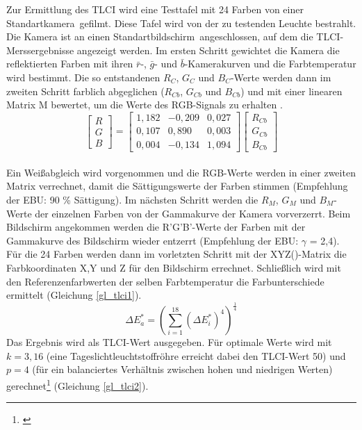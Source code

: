 Zur Ermittlung des TLCI wird eine Testtafel mit 24 Farben von einer \glqq Standartkamera\grqq\ gefilmt. Diese Tafel wird von der zu testenden Leuchte bestrahlt. Die Kamera ist an einen \glqq Standartbildschirm\grqq\ angeschlossen, auf dem die TLCI-Merssergebnisse angezeigt werden.
Im ersten Schritt gewichtet die Kamera die reflektierten Farben mit ihren $\bar{r}$-, $\bar{g}$- und $\bar{b}$-Kamerakurven und die Farbtemperatur wird bestimmt. Die so entstandenen $R_{C}$, $G_{C}$ und $B_{C}$-Werte werden dann im zweiten Schritt farblich abgeglichen ($R_{Cb}$, $G_{Cb}$ und $B_{Cb}$) und mit einer linearen Matrix M bewertet, um die Werte des RGB-Signals zu erhalten .
\begin{equation}\label{gl_tlci1}
\begin{bmatrix} R \\ G \\ B \end{bmatrix}= 
\begin{bmatrix} 1,182 & -0,209 & 0,027 \\ 0,107 & 0,890 & 0,003 \\ 0,004 & -0,134 & 1,094 \end{bmatrix}
\begin{bmatrix} R_{Cb} \\ G_{Cb} \\ B_{Cb} \end{bmatrix}
\end{equation}\\
Ein Weißabgleich wird vorgenommen und die RGB-Werte werden in einer zweiten Matrix verrechnet, damit die Sättigungswerte der Farben stimmen (Empfehlung der EBU: 90 \% Sättigung). Im nächsten Schritt werden die $R_{M}$, $G_{M}$ und $B_{M}$-Werte der einzelnen Farben von der Gammakurve der Kamera vorverzerrt.
Beim Bildschirm angekommen werden die R'G'B'-Werte der Farben mit der Gammakurve des Bildschirm wieder entzerrt (Empfehlung der EBU: $\gamma$ = 2,4). Für die 24 Farben werden dann im vorletzten Schritt mit der XYZ()-Matrix  die Farbkoordinaten X,Y und Z für den Bildschirm errechnet. Schließlich wird mit den Referenzenfarbwerten der selben Farbtemperatur die Farbunterschiede ermittelt (Gleichung \ref{gl_tlci1}).
\begin{equation}\label{gl_tlci1}
		\Delta E_{a} ^{*} = \left( {\sum_{i=1}^{18}(\Delta E_{i} ^{*})^{4}}  \right)^{\frac{1}{4}} 
\end{equation}
Das Ergebnis wird als TLCI-Wert ausgegeben. Für optimale Werte wird mit $k = 3,16$ (eine Tageslichtleuchtstoffröhre erreicht dabei den TLCI-Wert 50) und $p = 4$ (für ein balanciertes Verhältnis zwischen hohen und niedrigen Werten) gerechnet\footnote{\cite[16-22]{roberts}} (Gleichung \ref{gl_tlci2}).

